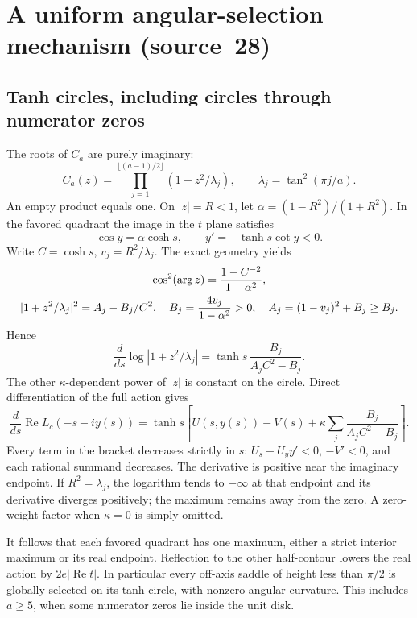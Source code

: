 \documentclass[11pt,a4paper]{article}
\numberwithin{equation}{section}
\theoremstyle{definition}
\theoremstyle{plain}
\newcommand{\src}[1]{\texorpdfstring{\textup{(source~#1)}}{(source #1)}}
\begin{document}
\section{A uniform angular-selection mechanism \src{28}}\label{pte:sec:ga-selection}
\subsection{Tanh circles, including circles through numerator zeros}
The roots of $C_a$ are purely imaginary:
\begin{equation}\label{pte:ga:factorization}
 C_a(z)=\prod_{j=1}^{\lfloor(a-1)/2\rfloor}
       (1+z^2/\lambda_j),\qquad
 \lambda_j=\tan^2(\pi j/a).
\end{equation}
An empty product equals one. On $|z|=R<1$, let $\alpha=(1-R^2)/(1+R^2)$. In the favored quadrant the image in the $t$ plane satisfies
\[
 \cos y=\alpha\cosh s,\qquad y'=-\tanh s\cot y<0.
\]
Write $C=\cosh s$, $v_j=R^2/\lambda_j$. The exact geometry yields
\begin{gather}
 \cos^2(\arg z)=\frac{1-C^{-2}}{1-\alpha^2},\notag\\
 |1+z^2/\lambda_j|^2=A_j-B_j/C^2,\quad
 B_j=\frac{4v_j}{1-\alpha^2}>0,\quad A_j=(1-v_j)^2+B_j\ge B_j.\label{pte:ga:factorcircle}
\end{gather}
Hence
\[
 \frac d{ds}\log|1+z^2/\lambda_j|
 =\tanh s\,\frac{B_j}{A_jC^2-B_j}.
\]
The other $\kappa$-dependent power of $|z|$ is constant on the circle. Direct differentiation of the full action gives
\begin{equation}\label{pte:ga:circleprofile}
 \frac d{ds}\operatorname{Re}L_c(-s-iy(s))
 =\tanh s\left[U(s,y(s))-V(s)
       +\kappa\sum_j\frac{B_j}{A_jC^2-B_j}\right].
\end{equation}
Every term in the bracket decreases strictly in $s$: $U_s+U_y y'<0$, $-V'<0$, and each rational summand decreases. The derivative is positive near the imaginary endpoint. If $R^2=\lambda_j$, the logarithm tends to $-\infty$ at that endpoint and its derivative diverges positively; the maximum remains away from the zero. A zero-weight factor when $\kappa=0$ is simply omitted.

It follows that each favored quadrant has one maximum, either a strict interior maximum or its real endpoint. Reflection to the other half-contour lowers the real action by $2e|\operatorname{Re}t|$. In particular every off-axis saddle of height less than $\pi/2$ is globally selected on its tanh circle, with nonzero angular curvature. This includes $a\ge5$, when some numerator zeros lie inside the unit disk.
\end{document}

